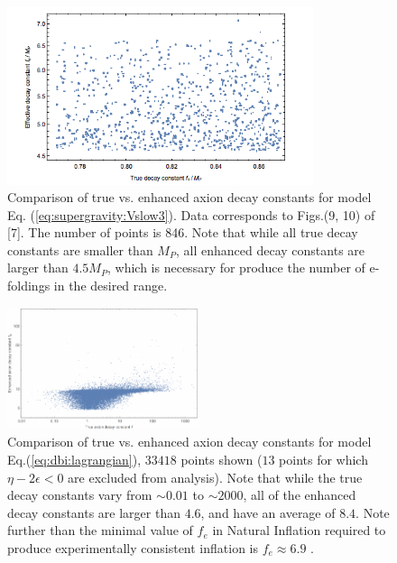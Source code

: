 \documentclass[12pt]{article}
\begin{document}
\begin{figure}
  \centering
  \includegraphics[width=0.8\textwidth]{figs/figsugra.png}
  \caption{ Comparison of true vs. enhanced axion decay constants for model Eq. (\ref{eq:supergravity:Vslow3}). Data corresponds to Figs.(9, 10) of [7]. The number of points is 846. Note that while all true decay constants are smaller than $M_P$, all enhanced decay constants are larger than
    $4.5 M_P$, which is necessary for produce the number of e-foldings in the desired range.}
  \label{figsugra}
\end{figure}

\begin{figure}
  \centering
  \includegraphics[width=0.5\textwidth]{figs/fige.pdf}
  \caption{Comparison of true vs. enhanced axion decay constants for model Eq.(\ref{eq:dbi:lagrangian}), $33418$ points shown ($13$ points for which $\eta - 2\epsilon < 0$ are excluded from analysis). Note that while the true decay constants vary from $\sim 0.01$ to $\sim 2000$, all of the enhanced decay constants are larger than $4.6$, and have an average of $8.4$. Note further than the minimal value of ${f}_{e}$ in Natural Inflation required to produce experimentally consistent inflation is ${f}_{e} \approx 6.9$ \cite{Ade:2015lrj}.}
  \label{Figure:fig.enhancement.sim}
\end{figure}
\end{document}
